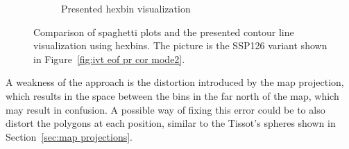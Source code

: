 \begin{figure}[!htb]
\begin{subfigure}[b]{0.51\textwidth}
    \caption{Presented hexbin visualization}
    \label{fig:comparsion member vis hexbin}
  \end{subfigure}
  \caption{Comparison of spaghetti plots and the presented contour line visualization using hexbins. The picture is the SSP126 variant shown in Figure~\ref{fig:ivt eof pr cor mode2}.}
    \label{fig:comparsion member vis}
\end{figure}


A weakness of the approach is the distortion introduced by the map projection, which results in the space between the bins in the far north of the map, which may result in confusion. 
A possible way of fixing this error could be to also distort the polygons at each position, similar to the Tissot's spheres shown in Section~\ref{sec:map projections}. 

%

